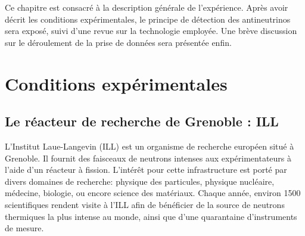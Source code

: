 Ce chapitre est consacré à la description générale de l'expérience. Après avoir décrit les conditions expérimentales, le principe de détection des antineutrinos sera exposé, suivi d'une revue sur la technologie employée. Une brève discussion sur le déroulement de la prise de données sera présentée enfin.\\ 

\bigbreak 


% 
% 


\section{Conditions expérimentales} 

\subsection{Le réacteur de recherche de Grenoble : ILL} 

L'Institut Laue-Langevin (ILL) est un organisme de recherche européen situé à Grenoble. Il fournit des faisceaux de neutrons intenses aux expérimentateurs à l'aide d'un réacteur à fission. L'intérêt pour cette infrastructure est porté par divers domaines de recherche: physique des particules, physique nucléaire, médecine, biologie, ou encore science des matériaux. Chaque année, environ 1500 scientifiques rendent visite à l'ILL afin de bénéficier de la source de neutrons thermiques la plus intense au monde, ainsi que d'une quarantaine d'instruments de mesure.\\ 


